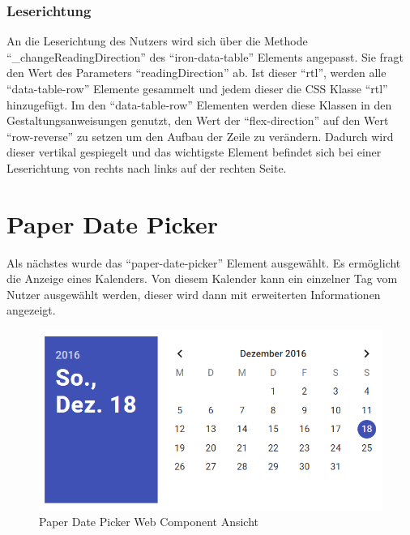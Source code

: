 \documentclass[12pt, paper=a4, bibtotoc, toc=listof, headsepline=true]{scrreprt}
\begin{document}
	\subsubsection{Leserichtung}
	An die Leserichtung des Nutzers wird sich über die Methode \enquote{\_changeReadingDirection} des \enquote{iron-data-table} Elements angepasst. Sie fragt den Wert des Parameters \enquote{readingDirection} ab. Ist dieser \enquote{rtl}, werden alle \enquote{data-table-row} Elemente gesammelt und jedem dieser die CSS Klasse \enquote{rtl} hinzugefügt. Im den \enquote{data-table-row} Elementen werden diese Klassen in den Gestaltungsanweisungen genutzt, den Wert der \enquote{flex-direction} auf den Wert \enquote{row-reverse} zu setzen um den Aufbau der Zeile zu verändern. Dadurch wird dieser vertikal gespiegelt und das wichtigste Element befindet sich bei einer Leserichtung von rechts nach links auf der rechten Seite.
	\newpage	
	\section{Paper Date Picker}
	Als nächstes wurde das \enquote{paper-date-picker} Element ausgewählt\cite{datPic}. Es ermöglicht die Anzeige eines Kalenders. Von diesem Kalender kann ein einzelner Tag vom Nutzer ausgewählt werden, dieser wird dann mit erweiterten Informationen angezeigt.
		\begin{figure}[H]		
			\centering
			\includegraphics[width=\textwidth,height=\textheight,keepaspectratio]{datPic.png}
			\caption[Paper Date Picker]{Paper Date Picker Web Component Ansicht}
			\label{img:datPic}
		\end{figure}
\end{document}
